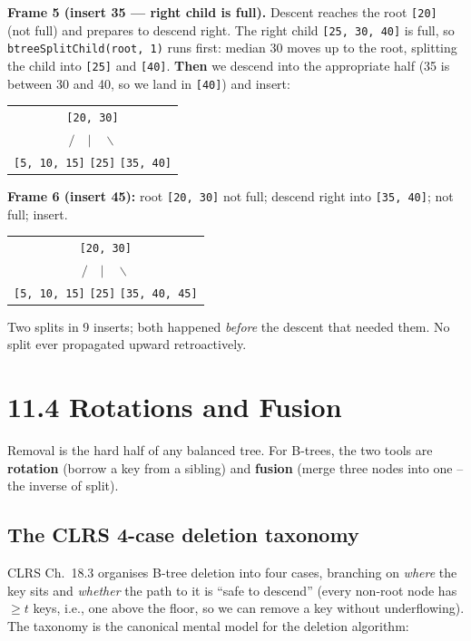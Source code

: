 \documentclass[11pt]{article}
\begin{document}
\begin{examplebox}
\textbf{Frame 5 (insert 35 --- right child is full).} Descent reaches
the root \texttt{[20]} (not full) and prepares to descend right. The
right child \texttt{[25, 30, 40]} is full, so
\texttt{btreeSplitChild(root, 1)} runs first: median 30 moves up to
the root, splitting the child into \texttt{[25]} and \texttt{[40]}.
\textbf{Then} we descend into the appropriate half (35 is between 30
and 40, so we land in \texttt{[40]}) and insert:
\begin{center}\begin{tabular}{c}
    \texttt{[20, 30]} \\
    $/ \quad | \quad \backslash$ \\
    \texttt{[5, 10, 15]} \quad \texttt{[25]} \quad \texttt{[35, 40]}
\end{tabular}\end{center}

\textbf{Frame 6 (insert 45):} root \texttt{[20, 30]} not full;
descend right into \texttt{[35, 40]}; not full; insert.
\begin{center}\begin{tabular}{c}
    \texttt{[20, 30]} \\
    $/ \quad | \quad \backslash$ \\
    \texttt{[5, 10, 15]} \quad \texttt{[25]} \quad \texttt{[35, 40, 45]}
\end{tabular}\end{center}

Two splits in 9 inserts; both happened \emph{before} the descent
that needed them. No split ever propagated upward retroactively.
\end{examplebox}

\section{11.4 Rotations and Fusion}

Removal is the hard half of any balanced tree. For B-trees, the two tools are \textbf{rotation} (borrow a key from a sibling) and \textbf{fusion} (merge three nodes into one -- the inverse of split).

\subsection*{The CLRS 4-case deletion taxonomy}

CLRS Ch.~18.3 organises B-tree deletion into four cases, branching
on \emph{where} the key sits and \emph{whether} the path to it is
``safe to descend'' (every non-root node has $\ge t$ keys, i.e., one
above the floor, so we can remove a key without underflowing). The
taxonomy is the canonical mental model for the deletion algorithm:
\end{document}
